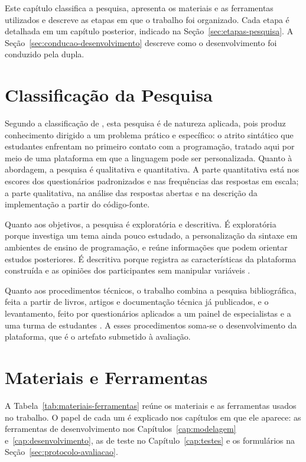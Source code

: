 
Este capítulo classifica a pesquisa, apresenta os materiais e as ferramentas utilizados e descreve as etapas em que o trabalho foi organizado. Cada etapa é detalhada em um capítulo posterior, indicado na Seção~\ref{sec:etapas-pesquisa}. A Seção~\ref{sec:conducao-desenvolvimento} descreve como o desenvolvimento foi conduzido pela dupla.

\section{Classificação da Pesquisa}
\label{sec:classificacao-pesquisa}

Segundo a classificação de , esta pesquisa é de natureza aplicada, pois produz conhecimento dirigido a um problema prático e específico: o atrito sintático que estudantes enfrentam no primeiro contato com a programação, tratado aqui por meio de uma plataforma em que a linguagem pode ser personalizada. Quanto à abordagem, a pesquisa é qualitativa e quantitativa. A parte quantitativa está nos escores dos questionários padronizados e nas frequências das respostas em escala; a parte qualitativa, na análise das respostas abertas e na descrição da implementação a partir do código-fonte.

Quanto aos objetivos, a pesquisa é exploratória e descritiva. É exploratória porque investiga um tema ainda pouco estudado, a personalização da sintaxe em ambientes de ensino de programação, e reúne informações que podem orientar estudos posteriores. É descritiva porque registra as características da plataforma construída e as opiniões dos participantes sem manipular variáveis \cite{prodanov2013}.

Quanto aos procedimentos técnicos, o trabalho combina a pesquisa bibliográfica, feita a partir de livros, artigos e documentação técnica já publicados, e o levantamento, feito por questionários aplicados a um painel de especialistas e a uma turma de estudantes \cite{prodanov2013}. A esses procedimentos soma-se o desenvolvimento da plataforma, que é o artefato submetido à avaliação.

\section{Materiais e Ferramentas}
\label{sec:materiais-ferramentas}

A Tabela~\ref{tab:materiais-ferramentas} reúne os materiais e as ferramentas usados no trabalho. O papel de cada um é explicado nos capítulos em que ele aparece: as ferramentas de desenvolvimento nos Capítulos~\ref{cap:modelagem} e~\ref{cap:desenvolvimento}, as de teste no Capítulo~\ref{cap:testes} e os formulários na Seção~\ref{sec:protocolo-avaliacao}.

